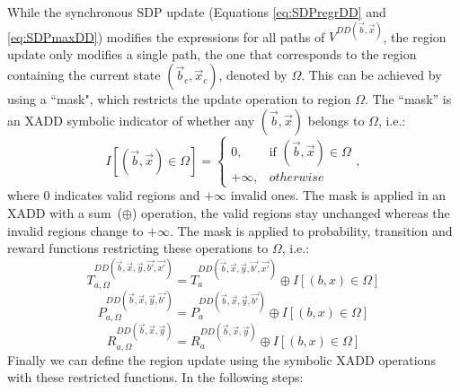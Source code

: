 While the synchronous SDP update (Equations \ref{eq:SDPregrDD} and \ref{eq:SDPmaxDD}) modifies the expressions for all paths of $V^{DD(\vec{b},\vec{x})}$, the region update only modifies a single path, the one that corresponds to the region containing the current state $(\vec{b}_c,\vec{x}_c)$, denoted by $\Omega$.
This can be achieved by using a ``mask", which restricts the update operation to region $\Omega$. The  ``mask'' is an XADD symbolic indicator of whether any $(\vec{b},\vec{x})$ belongs to $\Omega$, i.e.:
\begin{equation}
I[ (\vec{b},\vec{x}) \in \Omega] = \begin{cases}
	0,&\mbox{if } (\vec{b},\vec{x}) \in \Omega\\
	+\infty, & otherwise
	\end{cases},
\end{equation}
where $0$ indicates valid regions and $+\infty$ invalid ones. The mask is applied in an XADD with a sum~($\oplus$) operation, the valid regions stay unchanged whereas the invalid regions change to $+\infty$.
The mask is applied to probability, transition and reward functions restricting these operations to $\Omega$, i.e.:
\begin{equation}
T_{a,\Omega}^{DD(\vec{b},\vec{x},\vec{y},\vec{b'},\vec{x'})} = T_{a}^{DD(\vec{b},\vec{x},\vec{y},\vec{b'},\vec{x'})} \oplus I[ (b,x) \in \Omega] 
\end{equation}
\begin{equation}
P_{a,\Omega}^{DD(\vec{b},\vec{x},\vec{y},\vec{b'})} = P_{a}^{DD(\vec{b},\vec{x},\vec{y},\vec{b'})} \oplus I[ (b,x) \in \Omega] 
\end{equation}
\begin{equation}
R_{a,\Omega}^{DD(\vec{b},\vec{x},\vec{y})} = R_{a}^{DD(\vec{b},\vec{x},\vec{y})} \oplus I[ (b,x) \in \Omega] 
\end{equation}
Finally we can define the region update using the symbolic XADD operations with these restricted functions. In the following steps:
